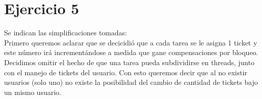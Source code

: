 \section{Ejercicio 5}
Se indican las simplificaciones tomadas:\\
Primero queremos aclarar que se decicidió que a cada tarea se le asigna 1 ticket y este número irá 
incrementándose a medida que gane compensaciones por bloqueo.\\
Decidimos omitir el hecho de que una tarea pueda subdividirse en threads, junto con el manejo
de tickets del usuario. Con esto queremos decir que al no existir usuarios (solo uno) no existe la posibilidad del cambio
de cantidad de tickets bajo un mismo usuario.

